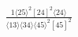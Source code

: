 \documentclass[varwidth, border=5pt]{standalone}
\begin{document}
\begin{my}
$\begin{gathered}
\scriptscriptstyle\frac{1⟨25⟩^2[24]^2⟨24⟩}{⟨13⟩⟨34⟩⟨45⟩^2[45]^2}
\end{gathered}$
\end{my}
\end{document}
